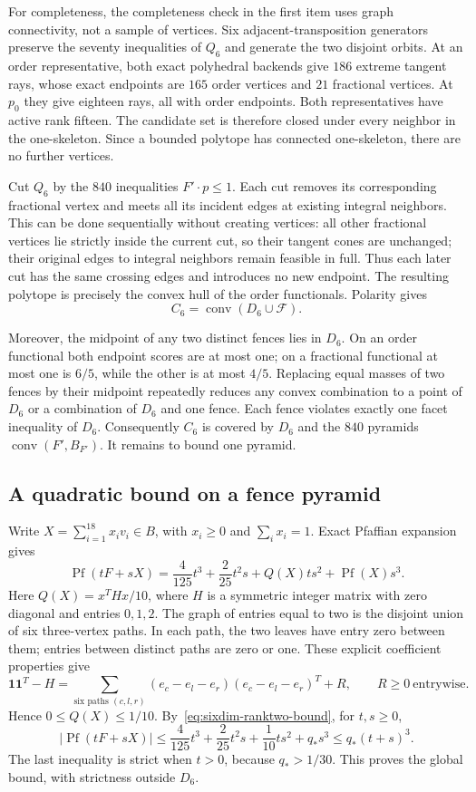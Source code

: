 For completeness, the completeness check in the first item uses graph
connectivity, not a sample of vertices. Six adjacent-transposition generators
preserve the seventy inequalities of $Q_6$ and generate the two disjoint
orbits. At an order representative, both exact polyhedral backends give
$186$ extreme tangent rays, whose exact endpoints are $165$ order vertices
and $21$ fractional vertices. At $p_0$ they give eighteen rays, all with
order endpoints. Both representatives have active rank fifteen. The candidate
set is therefore closed under every neighbor in the one-skeleton. Since a
bounded polytope has connected one-skeleton, there are no further vertices.

Cut $Q_6$ by the $840$ inequalities $F'\cdot p\le1$. Each cut removes
its corresponding fractional vertex and meets all its incident edges at
existing integral neighbors. This can be done sequentially without creating
vertices: all other fractional vertices lie strictly inside the current cut,
so their tangent cones are unchanged; their original edges to integral
neighbors remain feasible in full. Thus each later cut has the same crossing
edges and introduces no new endpoint. The resulting polytope is precisely
the convex hull of the order functionals. Polarity gives
\[
 C_6=\operatorname{conv}(D_6\cup\mathcal F).
\]

Moreover, the midpoint of any two distinct fences lies in $D_6$. On an
order functional both endpoint scores are at most one; on a fractional
functional at most one is $6/5$, while the other is at most $4/5$.
Replacing equal masses of two fences by their midpoint repeatedly reduces
any convex combination to a point of $D_6$ or a combination of $D_6$ and
one fence. Each fence violates exactly one facet inequality of $D_6$.
Consequently $C_6$ is covered by $D_6$ and the $840$ pyramids
$\operatorname{conv}(F',B_{F'})$. It remains to bound one pyramid.

\subsection{A quadratic bound on a fence pyramid}

Write $X=\sum_{i=1}^{18}x_iv_i\in B$, with $x_i\ge0$ and
$\sum_i x_i=1$. Exact Pfaffian expansion gives
\[
 \operatorname{Pf}(tF+sX)
 =\frac4{125}t^3+\frac2{25}t^2s+Q(X)ts^2
       +\operatorname{Pf}(X)s^3.
\]
Here $Q(X)=x^THx/10$, where $H$ is a symmetric integer matrix with zero
diagonal and entries $0,1,2$. The graph of entries equal to two is the
disjoint union of six three-vertex paths. In each path, the two leaves have
entry zero between them; entries between distinct paths are zero or one.
These explicit coefficient properties give
\[
 \mathbf1\mathbf1^T-H
 =\sum_{\text{six paths }(c,l,r)}
       (e_c-e_l-e_r)(e_c-e_l-e_r)^T+R,
 \qquad R\ge0\ \text{entrywise}.
\]
Hence $0\le Q(X)\le1/10$. By~\eqref{eq:sixdim-ranktwo-bound}, for
$t,s\ge0$,
\[
 |\operatorname{Pf}(tF+sX)|
 \le\frac4{125}t^3+\frac2{25}t^2s+\frac1{10}ts^2+q_*s^3
 \le q_*(t+s)^3.
\]
The last inequality is strict when $t>0$, because $q_*>1/30$.
This proves the global bound, with strictness outside $D_6$.

